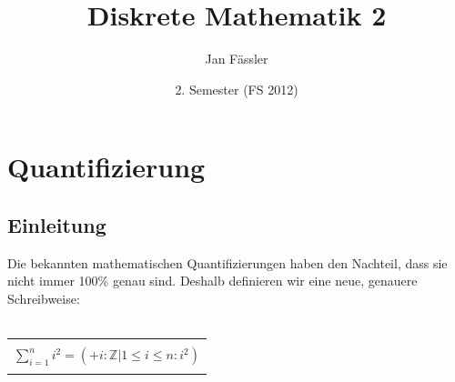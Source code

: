 \documentclass[a4paper,10pt]{article}
\title{Diskrete Mathematik 2}
\author{Jan F\"assler}
\date{2. Semester (FS 2012)}
\newcommand{\ZN}{\mathbb{Z}} %
\begin{document}
\maketitle
\thispagestyle{fancy}

\newpage


\tableofcontents	  	


\newpage
\setcounter{page}{1}

\section{Quantifizierung}

\subsection{Einleitung}
Die bekannten mathematischen Quantifizierungen haben den Nachteil, dass sie nicht immer 100\% genau sind. Deshalb definieren wir eine neue, genauere Schreibweise: \\ \\
\begin{tabular}{| c |}
\hline
\\  $\sum_{i=1}^{n} i^2=(+i:\ZN | 1 \leq i \leq n:i^2)$ \\ \\
\hline
\end{tabular}
\end{document}
